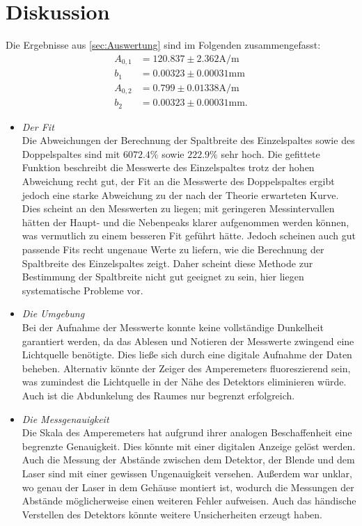 \section{Diskussion}
\label{sec:Diskussion}
Die Ergebnisse aus \ref{sec:Auswertung} sind im Folgenden zusammengefasst:
\begin{align*}
  A_{0,1} & = 120.837 \pm 2.362 \si{\ampere\per\meter}\\
  b_1     & = 0.00323 \pm 0.00031 \si{\milli\meter} \\
  A_{0,2} & =  0.799 \pm 0.01338 \si{\ampere\per\meter}\\
  b_2     & =  0.00323 \pm 0.00031 \si{\milli\meter}.
\end{align*}

\begin{itemize}
  \item \textit{Der Fit} \\
    Die Abweichungen der Berechnung der Spaltbreite des Einzelspaltes sowie des Doppelspaltes sind mit $6072.4 \si{\percent}$ sowie $222.9 \si{\percent}$ sehr hoch. Die gefittete Funktion beschreibt die
    Messwerte des Einzelspaltes trotz der hohen Abweichung recht gut, der Fit an die Messwerte
    des Doppelspaltes ergibt jedoch eine starke Abweichung zu der nach der Theorie
    erwarteten Kurve. Dies scheint an den Messwerten zu liegen; mit geringeren Messintervallen
    hätten der Haupt- und die Nebenpeaks klarer aufgenommen werden können, was
    vermutlich zu einem besseren Fit geführt hätte. Jedoch scheinen auch gut passende
    Fits recht ungenaue Werte zu liefern, wie die Berechnung der Spaltbreite des
    Einzelspaltes zeigt. Daher scheint diese Methode zur Bestimmung der Spaltbreite
    nicht gut geeignet zu sein, hier liegen systematische Probleme vor.

  \item \textit{Die Umgebung} \\
    Bei der Aufnahme der Messwerte konnte keine vollständige Dunkelheit garantiert
    werden, da das Ablesen und Notieren der Messwerte zwingend eine Lichtquelle
    benötigte. Dies ließe sich durch eine digitale Aufnahme der Daten beheben.
    Alternativ könnte der Zeiger des Amperemeters fluoreszierend sein, was zumindest
    die Lichtquelle in der Nähe des Detektors eliminieren würde. Auch ist die
    Abdunkelung des Raumes nur begrenzt erfolgreich.

  \item \textit{Die Messgenauigkeit} \\
    Die Skala des Amperemeters hat aufgrund ihrer analogen Beschaffenheit eine
    begrenzte Genauigkeit. Dies könnte mit einer digitalen Anzeige gelöst werden.
    Auch die Messung der Abstände zwischen dem Detektor, der Blende und dem Laser
    sind mit einer gewissen Ungenauigkeit versehen. Außerdem war unklar, wo genau
    der Laser in dem Gehäuse montiert ist, wodurch die Messungen der Abstände
    möglicherweise einen weiteren Fehler aufweisen. Auch das händische Verstellen
    des Detektors könnte weitere Unsicherheiten erzeugt haben.


\end{itemize}
